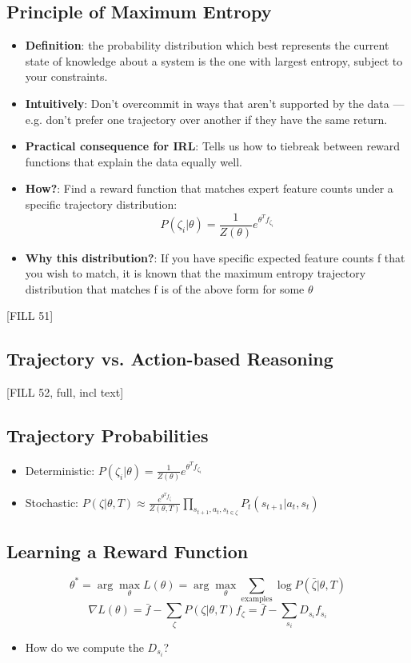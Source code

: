 \documentclass[10pt]{article}
\begin{document}
\subsection*{Principle of Maximum Entropy}
\begin{itemize}
	\item \textbf{Definition}: the probability distribution which best represents the current state of knowledge about a system is the one with largest entropy, subject to your constraints.
    \item \textbf{Intuitively}: Don't overcommit in ways that aren't supported by the data — e.g. don't prefer one trajectory over another if they have the same return.
    \item \textbf{Practical consequence for IRL}: Tells us how to tiebreak between reward functions that explain the data equally well.
    \item \textbf{How?}: Find a reward function that matches expert feature counts under a specific trajectory distribution:
    \[P(\zeta_i | \theta) = \frac{1}{Z(\theta)} e^{\theta^T f_{\zeta_i}}\]
    \item \textbf{Why this distribution?}: If you have specific expected feature counts f that you wish to match, it is known that the maximum entropy trajectory distribution that matches f is of the above form for some $\theta$
\end{itemize}

[FILL 51]

\subsection*{Trajectory vs. Action-based Reasoning}
[FILL 52, full, incl text]

\subsection*{Trajectory Probabilities}
\begin{itemize}
	\item Deterministic: $P(\zeta_i | \theta) = \frac{1}{Z(\theta)} e^{\theta^T f_{\zeta_i}}$
	\item Stochastic: $P(\zeta|\theta, T) \approx \frac{e^{\theta^T f_\zeta}}{Z(\theta, T)} \prod_{s_{t + 1}, a_t, s_{t \in \zeta}} P_t (s_{t + 1} | a_t, s_t)$
\end{itemize}

\subsection*{Learning a Reward Function}
\[\theta^* = \arg\max_{\theta} L(\theta) = \arg\max_{\theta} \sum_{\text{examples}} \log P(\bar{\zeta} | \theta, T)\]
\[\nabla L(\theta) = \bar{f} - \sum_{\zeta} P(\zeta | \theta, T) f_\zeta = \bar{f} - \sum_{s_i} D_{s_i} f_{s_i}\]
\begin{itemize}
	\item How do we compute the $D_{s_i}$?
\end{itemize}
\end{document}
